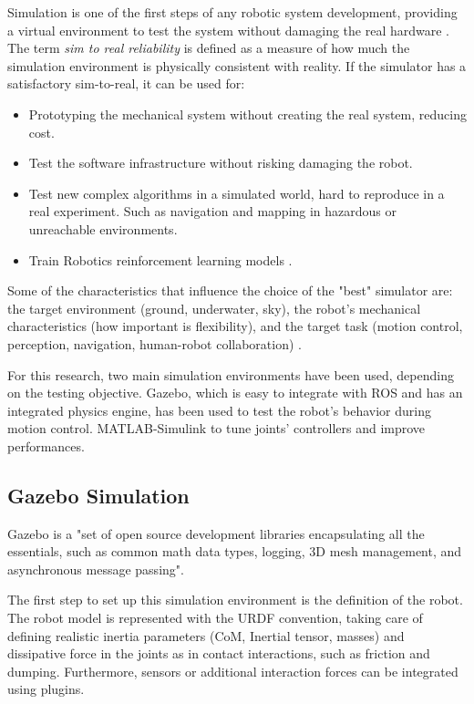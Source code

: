 Simulation is one of the first steps of any robotic system development, providing a virtual environment to test the system without damaging the real hardware \cite{RobotSimulation}\cite{RobotSimulation2}. 
The term \textit{sim to real reliability} is defined as a measure of how much the simulation environment is physically consistent with reality.
If the simulator has a satisfactory sim-to-real, it can be used for: 
\begin{itemize}
    \setlength\itemsep{-0.7em} 
    \item Prototyping the mechanical system without creating the real system, reducing cost. 
    \item Test the software infrastructure without risking damaging the robot.
    \item Test new complex algorithms in a simulated world, hard to reproduce in a real experiment. Such as navigation and mapping in hazardous or unreachable environments.  
    \item Train Robotics reinforcement learning models \cite{RL_overview}\cite{RobotSimulationRL}. 
\end{itemize}

Some of the characteristics that influence the choice of the "best" simulator are: the target environment (ground, underwater, sky), the robot's mechanical characteristics (how important is flexibility), and the target task (motion control, perception, navigation, human-robot collaboration) \cite{RobotSimulation1}.

For this research, two main simulation environments have been used, depending on the testing objective.  Gazebo, which is easy to integrate with ROS and has an integrated physics engine, has been used to test the robot's behavior during motion control. MATLAB-Simulink to tune joints' controllers and improve performances.

\subsection{Gazebo Simulation}
\label{sec:gazebo}

Gazebo is a "set of open source development libraries encapsulating all the essentials, such as common math data types, logging, 3D mesh management, and asynchronous message passing"\cite{gazebo}.

The first step to set up this simulation environment is the definition of the robot.
The robot model is represented with the URDF convention, taking care of defining realistic inertia parameters (CoM, Inertial tensor, masses) and dissipative force in the joints as in contact interactions, such as friction and dumping.
Furthermore, sensors or additional interaction forces can be integrated using plugins. 

